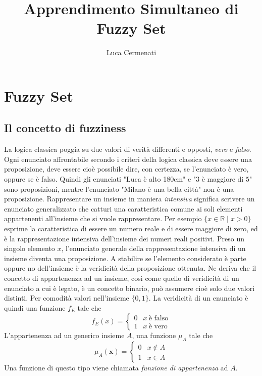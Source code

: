 \documentclass [10pt,a4paper,twoside,openright] {book}
\begin{document}
\title{Apprendimento Simultaneo di Fuzzy Set}
\author{Luca Cermenati}
\maketitle
\tableofcontents
\chapter{Fuzzy Set}
\section{Il concetto di fuzziness}
La logica classica poggia su due valori di verità differenti e opposti, \textit{vero} e \textit{falso}. Ogni enunciato affrontabile secondo i criteri della logica classica deve essere una proposizione, deve essere cioè possibile dire, con certezza, se l'enunciato è vero, oppure se è falso. Quindi gli enunciati "Luca è alto 180cm" e "$3$ è maggiore di $5$" sono proposizioni, mentre l'enunciato "Milano è una bella città" non è una proposizione.
Rappresentare un insieme in maniera \textit{intensiva} significa scrivere un enunciato generalizzato che catturi una caratteristica comune ai soli elementi appartenenti all'insieme che si vuole rappresentare. Per esempio $\lbrace x \in \mathbb{R} \mid x > 0 \rbrace$ esprime la caratteristica di essere un numero reale e di essere maggiore di zero, ed è la rappresentazione intensiva dell'insieme dei numeri reali positivi. Preso un singolo elemento $x$, l'enunciato generale della rappresentazione intensiva di un insieme diventa una proposizione. A stabilire se l'elemento considerato è parte oppure no dell'insieme è la veridicità della proposizione ottenuta. Ne deriva che il concetto di appartenenza ad un insieme, così come quello di veridicità di un enunciato a cui è legato, è un concetto binario, può assumere cioè solo due valori distinti. Per comodità valori nell'insieme $\lbrace 0, 1 \rbrace$.
La veridicità di un enunciato è quindi una funzione $f_E$ tale che
\[
f_E(x)=
\begin{cases}
0 & x \: \text{è falso} \\
1 & x \: \text{è vero}
\end{cases}
\]
L'appartenenza ad un generico insieme $A$, una funzione $\mu_A$ tale che
\[
\mu_A(\mathbf{x})=
\begin{cases}
0 & x \notin A \\
1 & x \in A
\end{cases}
\]
Una funzione di questo tipo viene chiamata \textit{funzione di appartenenza} ad $A$.
\end{document}
